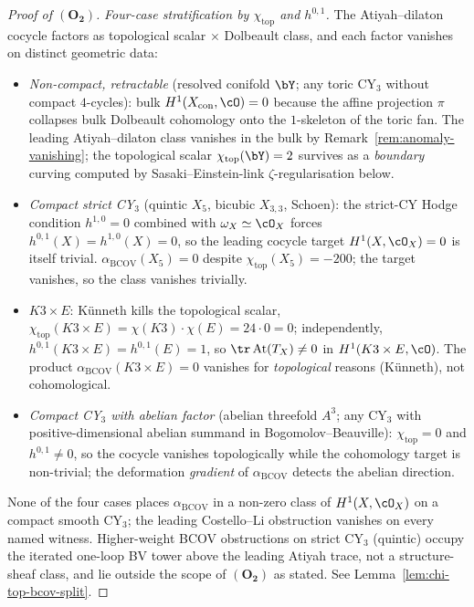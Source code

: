 \begin{proof}[Proof of $(\mathbf{O_2})$]
\emph{Four-case stratification by $\chi_{\mathrm{top}}$ and
$h^{0,1}$.} The Atiyah--dilaton cocycle factors as topological
scalar $\times$ Dolbeault class, and each factor vanishes on
distinct geometric data:
\begin{itemize}[leftmargin=2em]
 \item[$(\beta_1)$] \emph{Non-compact, retractable} (resolved
 conifold $\bY$; any toric CY$_3$ without compact $4$-cycles): bulk
 $H^1(X_{\mathrm{con}},\cO)=0$ because the affine projection
 $\pi$ collapses bulk Dolbeault cohomology onto the $1$-skeleton of
 the toric fan. The leading Atiyah--dilaton class vanishes in the
 bulk by Remark~\ref{rem:anomaly-vanishing}; the topological scalar
 $\chi_{\mathrm{top}}(\bY)=2$ survives as a \emph{boundary} curving
 computed by Sasaki--Einstein-link $\zeta$-regularisation below.
 \item[$(\beta_2)$] \emph{Compact strict CY$_3$} (quintic $X_5$,
 bicubic $X_{3,3}$, Schoen): the strict-CY Hodge condition
 $h^{1,0}=0$ combined with $\omega_X\simeq\cO_X$ forces
 $h^{0,1}(X)=h^{1,0}(X)=0$, so the leading cocycle target $H^1(X,
 \cO_X)=0$ is itself trivial. $\alpha_{\mathrm{BCOV}}(X_5)=0$
 despite $\chi_{\mathrm{top}}(X_5)=-200$; the target vanishes, so
 the class vanishes trivially.
 \item[$(\beta_3)$] \emph{$K3\times E$}: Künneth kills the
 topological scalar, $\chi_{\mathrm{top}}(K3\times E)=\chi(K3)\cdot
 \chi(E)=24\cdot 0=0$; independently, $h^{0,1}(K3\times E)=
 h^{0,1}(E)=1$, so $\tr\,\mathrm{At}(T_X)\neq 0$ in
 $H^1(K3\times E,\cO)$. The product
 $\alpha_{\mathrm{BCOV}}(K3\times E)=0$ vanishes for
 \emph{topological} reasons (Künneth), not cohomological.
 \item[$(\beta_4)$] \emph{Compact CY$_3$ with abelian factor}
 (abelian threefold $A^3$; any CY$_3$ with positive-dimensional
 abelian summand in Bogomolov--Beauville): $\chi_{\mathrm{top}}=0$
 and $h^{0,1}\neq 0$, so the cocycle vanishes topologically while
 the cohomology target is non-trivial; the deformation
 \emph{gradient} of $\alpha_{\mathrm{BCOV}}$ detects the abelian
 direction.
\end{itemize}
None of the four cases places $\alpha_{\mathrm{BCOV}}$ in a
non-zero class of $H^1(X,\cO_X)$ on a compact smooth CY$_3$; the
leading Costello--Li obstruction vanishes on every named witness.
Higher-weight BCOV obstructions on strict CY$_3$ (quintic) occupy
the iterated one-loop BV tower above the leading Atiyah trace, not
a structure-sheaf class, and lie outside the scope of
$(\mathbf{O_2})$ as stated. See Lemma~\ref{lem:chi-top-bcov-split}.


\end{proof}
